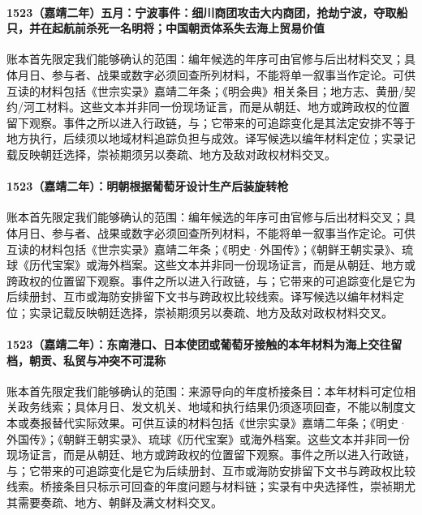\paragraph{1523（嘉靖二年）五月：宁波事件：细川商团攻击大内商团，抢劫宁波，夺取船只，并在起航前杀死一名明将；中国朝贡体系失去海上贸易价值} 账本首先限定我们能够确认的范围：编年候选的年序可由官修与后出材料交叉；具体月日、参与者、战果或数字必须回查所列材料，不能将单一叙事当作定论。可供互读的材料包括《世宗实录》嘉靖二年条；《明会典》相关条目；地方志、黄册/契约/河工材料。这些文本并非同一份现场证言，而是从朝廷、地方或跨政权的位置留下观察。事件之所以进入行政链，与；它带来的可追踪变化是其法定安排不等于地方执行，后续须以地域材料追踪负担与成效。译写候选以编年材料定位；实录记载反映朝廷选择，崇祯期须另以奏疏、地方及敌对政权材料交叉。

\paragraph{1523（嘉靖二年）：明朝根据葡萄牙设计生产后装旋转枪} 账本首先限定我们能够确认的范围：编年候选的年序可由官修与后出材料交叉；具体月日、参与者、战果或数字必须回查所列材料，不能将单一叙事当作定论。可供互读的材料包括《世宗实录》嘉靖二年条；《明史·外国传》；《朝鲜王朝实录》、琉球《历代宝案》或海外档案。这些文本并非同一份现场证言，而是从朝廷、地方或跨政权的位置留下观察。事件之所以进入行政链，与；它带来的可追踪变化是它为后续册封、互市或海防安排留下文书与跨政权比较线索。译写候选以编年材料定位；实录记载反映朝廷选择，崇祯期须另以奏疏、地方及敌对政权材料交叉。

\paragraph{1523（嘉靖二年）：东南港口、日本使团或葡萄牙接触的本年材料为海上交往留档，朝贡、私贸与冲突不可混称} 账本首先限定我们能够确认的范围：来源导向的年度桥接条目：本年材料可定位相关政务线索；具体月日、发文机关、地域和执行结果仍须逐项回查，不能以制度文本或奏报替代实际效果。可供互读的材料包括《世宗实录》嘉靖二年条；《明史·外国传》；《朝鲜王朝实录》、琉球《历代宝案》或海外档案。这些文本并非同一份现场证言，而是从朝廷、地方或跨政权的位置留下观察。事件之所以进入行政链，与；它带来的可追踪变化是它为后续册封、互市或海防安排留下文书与跨政权比较线索。桥接条目只标示可回查的年度问题与材料链；实录有中央选择性，崇祯期尤其需要奏疏、地方、朝鲜及满文材料交叉。

